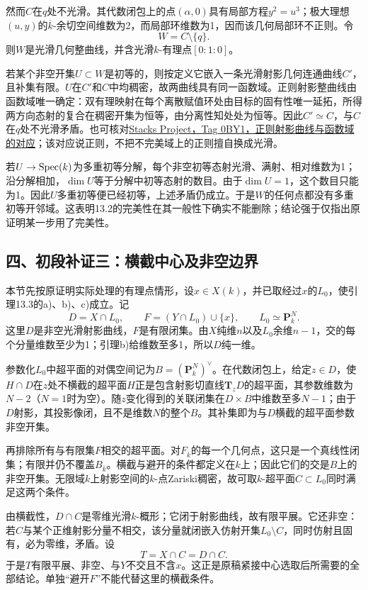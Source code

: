 然而$C$在$q$处不光滑。其代数闭包上的点$(\alpha,0)$具有局部方程$y^2=u^3$；极大理想$(u,y)$的$\overline k$-余切空间维数为2，而局部环维数为1，因而该几何局部环不正则。令
\[
W=C\setminus\{q\}.
\]
则$W$是光滑几何整曲线，并含光滑$k$-有理点$[0:1:0]$。

若某个非空开集$U\subset W$是初等的，则按定义它嵌入一条光滑射影几何连通曲线$C'$，且补集有限。$U$在$C'$和$C$中均稠密，故两曲线具有同一函数域。正则射影整曲线由函数域唯一确定：双有理映射在每个离散赋值环处由目标的固有性唯一延拓，所得两方向态射的复合在稠密开集为恒等，由分离性知处处为恒等。因此$C'\simeq C$，与$C$在$q$处不光滑矛盾。也可核对\href{https://stacks.math.columbia.edu/tag/0BY1}{Stacks Project，Tag 0BY1，正则射影曲线与函数域的对应}；该对应说正则，不把不完美域上的正则擅自换成光滑。

若$U\to\operatorname{Spec}(k)$为多重初等分解，每个非空初等态射光滑、满射、相对维数为1；沿分解相加，$\dim U$等于分解中初等态射的数目。由于$\dim U=1$，这个数目只能为1。因此$U$多重初等便已经初等，上述矛盾仍成立。于是$W$的任何点都没有多重初等开邻域。这表明13.2的完美性在其一般性下确实不能删除；结论强于仅指出原证明某一步用了完美性。

\subsection*{四、初段补证三：横截中心及非空边界}

本节先按原证明实际处理的有理点情形，设$x\in X(k)$，并已取经过$x$的$L_0$，使引理13.3的a)、b)、c)成立。记
\[
D=X\cap L_0,\qquad F=(Y\cap L_0)\cup\{x\},\qquad L_0\simeq\mathbf P^N_k.
\]
这里$D$是非空光滑射影曲线，$F$是有限闭集。由$X$纯维$n$以及$L_0$余维$n-1$，交的每个分量维数至少为1；引理b)给维数至多1，所以$D$纯一维。

参数化$L_0$中超平面的对偶空间记为$B=(\mathbf P^N_k)^\vee$。在代数闭包上，给定$z\in D$，使$H\cap D$在$z$处不横截的超平面$H$正是包含射影切直线$\mathbf T_zD$的超平面，其参数维数为$N-2$（$N=1$时为空）。随$z$变化得到的关联闭集在$D\times B$中维数至多$N-1$；由于$D$射影，其投影像闭，且不是维数$N$的整个$B$。其补集即为与$D$横截的超平面参数非空开集。

再排除所有与有限集$F$相交的超平面。对$F_{\overline k}$的每一个几何点，这只是一个真线性闭集；有限并仍不覆盖$B_{\overline k}$。横截与避开的条件都定义在$k$上；因此它们的交是$B$上的非空开集。无限域$k$上射影空间的$k$-点Zariski稠密，故可取$k$-超平面$C\subset L_0$同时满足这两个条件。

由横截性，$D\cap C$是零维光滑$k$-概形；它闭于射影曲线，故有限平展。它还非空：若$C$与某个正维射影分量不相交，该分量就闭嵌入仿射开集$L_0\setminus C$，同时仿射且固有，必为零维，矛盾。设
\[
T=X\cap C=D\cap C.
\]
于是$T$有限平展、非空、与$Y$不交且不含$x$。这正是原稿紧接中心选取后所需要的全部结论。单独“避开$F$”不能代替这里的横截条件。

